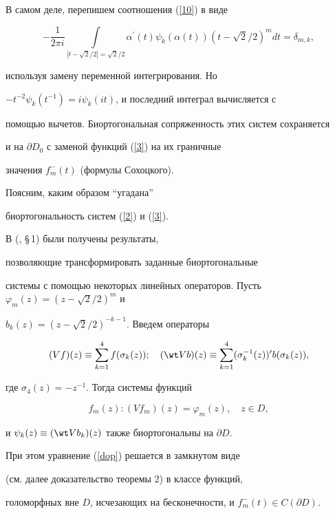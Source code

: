 В самом деле, перепишем соотношения (\ref{10}) в виде 


$$


-\frac{1}{2\pi i}\int\limits_{|t-\sqrt2/2|=\sqrt2/2} \alpha^\prime(t)


\psi_k(\alpha(t))(t-\sqrt2/2)^mdt=\delta_{m,k},


$$


используя замену переменной интегрирования. Но


$-t^{-2}\psi_k(t^{-1})=i\psi_k(it)$, и последний интеграл вычисляется с


помощью вычетов. Биортогональная сопряженность этих систем сохраняется


и на $\partial D_0$ с заменой функций (\ref{3}) на их граничные


значения $f^-_m(t)$ (формулы Сохоцкого).





Поясним, каким образом ``угадана''


биортогональность систем (\ref{2}) и (\ref{3}).


В (\cite{Avtor}, \S\,1) были получены результаты, 


позволяющие трансформировать заданные биортогональные 


системы с помощью некоторых линейных операторов.
Пусть $\varphi_m(z)=(z-\sqrt2/2)^m$ и 


$b_k(z)=(z-\sqrt2/2)^{-k-1}$. Введем операторы 


$$


(Vf)(z)\equiv\sum_{k=1}^4f(\sigma_k(z)); \quad


(\wt V b)(z)\equiv\sum_{k=1}^4(\sigma_k^{-1}(z))^\prime b(\sigma_k(z)),


$$


где $\sigma_4(z)=-z^{-1}$. Тогда системы функций 


\begin{equation}\label{dop}


f_m(z): (Vf_m)(z)=\varphi_m(z), \quad z\in D,


\end{equation}


и $\psi_k(z)\equiv (\wt V b_k)(z)$ также биортогональны на $\partial D$. 


При этом уравнение (\ref{dop}) решается в замкнутом виде 


(см. далее доказательство теоремы 2) в классе функций, 


голоморфных вне $D$, исчезающих на бесконечности, и
$f_m^-(t)\in C(\partial D)$.





